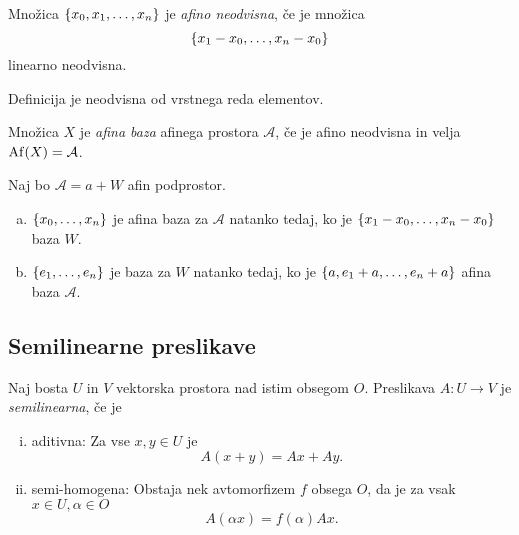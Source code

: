 \begin{definicija}
    Množica $\left\{x_0, x_1, \dots, x_n\right\}$ je \emph{afino neodvisna}, če je množica
    \[
    	\left\{x_1 - x_0, \dots, x_n - x_0\right\}
    \]
    linearno neodvisna.
\end{definicija}

\begin{opomba}
    Definicija je neodvisna od vrstnega reda elementov.
\end{opomba}

\begin{definicija}
    Množica $X$ je \emph{afina baza} afinega prostora $\mathcal{A}$, če je afino neodvisna in velja $\operatorname{Af} (X) = \mathcal{A}$.
\end{definicija}

\begin{izrek}
    Naj bo $\mathcal{A} = a + W$ afin podprostor.

	\begin{enumerate}[a)]
    \item $\left\{x_0, \dots, x_n\right\}$ je afina baza za $\mathcal{A}$ natanko tedaj, ko je $\left\{x_1 - x_0, \dots, x_n - x_0\right\}$ baza $W$.

    \item $\left\{e_1, \dots, e_n\right\}$ je baza za $W$ natanko tedaj, ko je $\left\{a, e_1 + a, \dots, e_n + a\right\}$ afina baza $\mathcal{A}$.	
	\end{enumerate}
\end{izrek}

\newpage

\subsection{Semilinearne preslikave}

\begin{definicija}
    Naj bosta $U$ in $V$ vektorska prostora nad istim obsegom $O$. Preslikava $A \colon U \to V$ je \emph{semilinearna}, če je
	
	\begin{enumerate}[(i)]
    \item aditivna: Za vse $x,y \in U$ je
    \[
    A(x + y) = Ax + Ay.    
    \]

    \item semi-homogena: Obstaja nek avtomorfizem $f$ obsega $O$, da je za vsak $x \in U, \alpha \in O$
    \[
    A(\alpha x) = f(\alpha) Ax.
    \]
	\end{enumerate}
\end{definicija}

